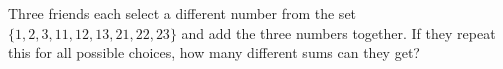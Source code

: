 Three friends each select a different number from the set $\{1,2,3,11,12,13,21,22,23\}$ and add the three numbers together. If they repeat this for all possible choices, how many different sums can they get?
